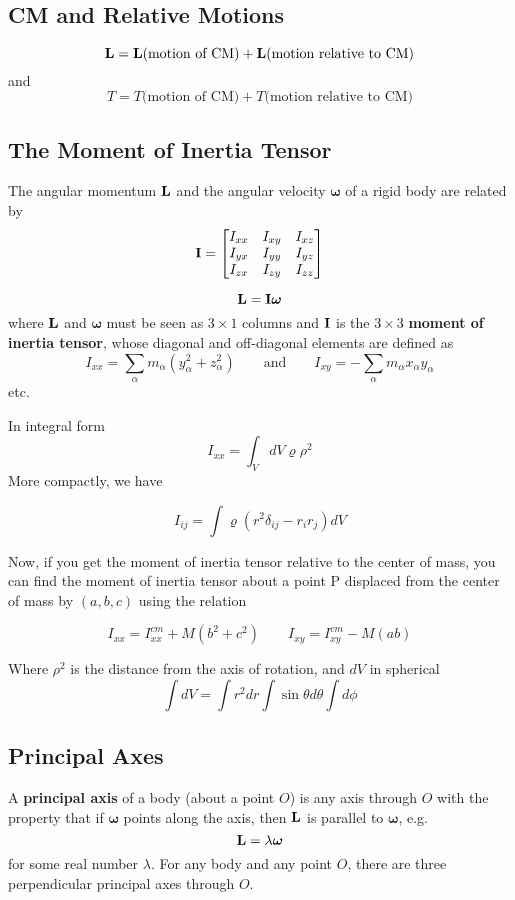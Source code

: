 \documentclass{article}
\begin{document}
\subsection*{CM and Relative Motions}
$$
\vb{L} = \vb{L}\text{(motion of CM)} + \vb{L}\text{(motion relative to CM)}
$$
and 
$$
T = T\text{(motion of CM)} + T\text{(motion relative to CM)}
$$
\subsection*{The Moment of Inertia Tensor}
The angular momentum $\vb{L}$ and the angular velocity $\bm\omega$ of a rigid body are related by 
$$
\vb{I} = 
\begin{bmatrix}
    I_{xx} & I_{xy} & I_{xz}\\
    I_{yx} & I_{yy} & I_{yz}\\
    I_{zx} & I_{zy} & I_{zz}\\
\end{bmatrix}
$$

$$
\vb{L} = \vb{I}\bm\omega
$$
where $\vb{L}$ and $\bm\omega$ must be seen as $3 \times 1$ columns and $\vb{I}$ is the $3\times3$ \textbf{moment of inertia tensor}, whose diagonal and off-diagonal elements are defined as 
$$
I_{xx} = \sum_{\alpha} m_{\alpha}(y_{\alpha}^2 + z_{\alpha}^2) \qquad \text{and} \qquad I_{xy} = -\sum_{\alpha} m_{\alpha}x_{\alpha}y_{\alpha}
$$
etc.

In integral form
$$
I_{xx} = \int_V dV \varrho \rho^2
$$
More compactly, we have

$$
I_{ij} = \int \varrho (r^2 \delta_{ij} - r_i r_j) dV
$$

Now, if you get the moment of inertia tensor relative to the center of mass, you can find the moment of inertia tensor about a point P displaced from the center of mass by $(a,b,c)$ using the relation

$$
I_{xx} = I_{xx}^{cm} + M(b^2 + c^2) \qquad I_{xy} = I_{xy}^{cm} - M(ab)
$$

Where $\rho^2$ is the distance from the axis of rotation, and $dV$ in spherical 
$$
\int dV = \int r^2 dr \int \sin\theta d\theta \int d\phi
$$


\subsection*{Principal Axes}
A \textbf{principal axis} of a body (about a point $O$) is any axis through $O$ with the property that if $\bm\omega$ points along the axis, then $\vb{L}$ is parallel to $\bm\omega$, e.g.
$$
\vb{L} = \lambda \bm\omega
$$
for some real number $\lambda$.  For any body and any point $O$, there are three perpendicular principal axes through $O$.
\end{document}
